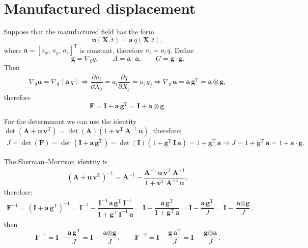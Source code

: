 \documentclass[11pt,a4paper]{article}
\newcommand{\Grad}{\nabla}
\newcommand{\Id}{\textbf{I}}
\begin{document}
\section{Manufactured displacement}

Suppose that the manufactured field has the form
%
\begin{equation}
\textbf{u}(\textbf{X},t)=\textbf{a}\,q(\textbf{X},t),
\label{eq_uCompact}
\end{equation}
%
where $\textbf{a}=[a_x,\,a_y,\,a_z]^{\text{T}}$ is constant, therefore $u_i=a_i\,q$. Define
%
\begin{equation}
\textbf{g}=\Grad_0 q,
\qquad
A=\textbf{a}\cdot\textbf{a},
\qquad
G=\textbf{g}\cdot\textbf{g}.
\end{equation}
%
Then
%
\begin{eqnarray}
\Grad_0\textbf{u}=\Grad_0(\textbf{a}\,q)\Rightarrow \dfrac{\partial u_i}{\partial X_j} = a_i\dfrac{\partial q}{\partial X_j}= a_i\,g_j\Rightarrow \boxed{\Grad_0\,\textbf{u}=\textbf{a}\,\textbf{g}^{\text{T}}=\textbf{a}\otimes\textbf{g}},
\end{eqnarray}
%
therefore
%
\begin{equation}
\boxed{\textbf{F}=\Id+\textbf{a}\,\textbf{g}^{\text{T}}=\Id+\textbf{a}\otimes\textbf{g}}.
\label{eq_FJcompact}
\end{equation}

For the determinant we can use the identity $\det(\textbf{A}+\textbf{u}\,\textbf{v}^\text{T})=\det(\textbf{A})(1+\textbf{v}^\text{T}\,\textbf{A}^{-1}\,\textbf{u})$, therefore:
%
\begin{eqnarray}
J=\det(\textbf{F})=\det(\Id+\textbf{a}\,\textbf{g}^\text{T})=\det(\Id)(1+\textbf{g}^\text{T}\,\Id\,\textbf{a})=1+\textbf{g}^\text{T}\,\textbf{a}\Rightarrow \boxed{J=1+\textbf{g}^\text{T}\,\textbf{a}=1+\textbf{a}\cdot\textbf{g}}.
\end{eqnarray}

The Sherman--Morrison identity is
%
\begin{eqnarray}
\left( \textbf{A}+\textbf{u}\,\textbf{v}^\text{T}\right) ^{-1}=\textbf{A}^{-1}-\dfrac{\textbf{A}^{-1}\,\textbf{u}\,\textbf{v}^\text{T}\,\textbf{A}^{-1}}{1+\textbf{v}^\text{T}\,\textbf{A}^{-1}\,\textbf{u}},
\end{eqnarray}
%
therefore:
%
\begin{eqnarray}
\textbf{F}^{-1}=\left( \Id+\textbf{a}\,\textbf{g}^{\text{T}}\right)^{-1}=\Id^{-1}-\dfrac{\Id^{-1}\,\textbf{a}\,\textbf{g}^\text{T}\,\Id^{-1}}{1+\textbf{g}^\text{T}\,\Id^{-1}\,\textbf{a}}=\Id-\dfrac{\textbf{a}\,\textbf{g}^\text{T}}{1+\textbf{g}^\text{T}\,\textbf{a}}=\Id-\dfrac{\textbf{a}\,\textbf{g}^\text{T}}{J}=\Id-\dfrac{\textbf{a}\otimes\textbf{g}}{J},
\end{eqnarray}
%
then
%
\begin{equation}
\boxed{
\textbf{F}^{-1}
=\Id-\dfrac{\textbf{a}\,\textbf{g}^\text{T}}{J}=\Id-\dfrac{\textbf{a}\otimes\textbf{g}}{J},
\qquad
\textbf{F}^{-\text{T}}
=\Id-\dfrac{\textbf{g}\,\textbf{a}^\text{T}}{J}=\Id-\dfrac{\textbf{g}\otimes\textbf{a}}{J}
}.
\label{eq_FinvCompact}
\end{equation}
\end{document}
